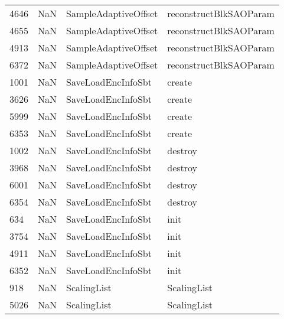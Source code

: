 \begin{tabular}{llll}
4646 &                   NaN &       SampleAdaptiveOffset &                    reconstructBlkSAOParam \\
4655 &                   NaN &       SampleAdaptiveOffset &                    reconstructBlkSAOParam \\
4913 &                   NaN &       SampleAdaptiveOffset &                    reconstructBlkSAOParam \\
6372 &                   NaN &       SampleAdaptiveOffset &                    reconstructBlkSAOParam \\
1001 &                   NaN &         SaveLoadEncInfoSbt &                                    create \\
3626 &                   NaN &         SaveLoadEncInfoSbt &                                    create \\
5999 &                   NaN &         SaveLoadEncInfoSbt &                                    create \\
6353 &                   NaN &         SaveLoadEncInfoSbt &                                    create \\
1002 &                   NaN &         SaveLoadEncInfoSbt &                                   destroy \\
3968 &                   NaN &         SaveLoadEncInfoSbt &                                   destroy \\
6001 &                   NaN &         SaveLoadEncInfoSbt &                                   destroy \\
6354 &                   NaN &         SaveLoadEncInfoSbt &                                   destroy \\
634  &                   NaN &         SaveLoadEncInfoSbt &                                      init \\
3754 &                   NaN &         SaveLoadEncInfoSbt &                                      init \\
4911 &                   NaN &         SaveLoadEncInfoSbt &                                      init \\
6352 &                   NaN &         SaveLoadEncInfoSbt &                                      init \\
918  &                   NaN &                ScalingList &                               ScalingList \\
5026 &                   NaN &                ScalingList &                               ScalingList \\

\end{tabular}

